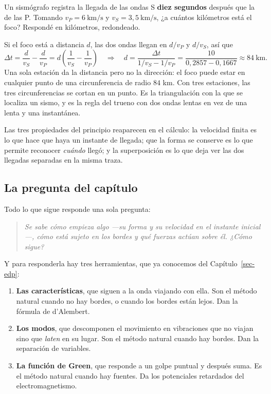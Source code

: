 \documentclass[
  spanish,
  a4paper,
]{scrbook}
\providecommand{\tightlist}{%
  \setlength{\itemsep}{0pt}\setlength{\parskip}{0pt}}
\theoremstyle{definition}
\theoremstyle{plain}
\theoremstyle{definition}
\theoremstyle{plain}
\theoremstyle{definition}
\theoremstyle{remark}
\begin{document}
Un sismógrafo registra la llegada de las ondas S \textbf{diez segundos}
después que la de las P. Tomando \(v_P = 6\ \text{km/s}\) y
\(v_S = 3{,}5\ \text{km/s}\), ¿a cuántos kilómetros está el foco?
Respondé en kilómetros, redondeado.

Si el foco está a distancia \(d\), las dos ondas llegan en \(d/v_P\) y
\(d/v_S\), así que \[
\Delta t = \frac{d}{v_S} - \frac{d}{v_P} = d\left(\frac{1}{v_S}-\frac{1}{v_P}\right)
\quad\Longrightarrow\quad
d = \frac{\Delta t}{1/v_S - 1/v_P} = \frac{10}{0{,}2857 - 0{,}1667} \approx 84\ \text{km}.
\] Una sola estación da la distancia pero no la dirección: el foco puede
estar en cualquier punto de una circunferencia de radio \(84\) km. Con
tres estaciones, las tres circunferencias se cortan en un punto. Es la
triangulación con la que se localiza un sismo, y es la regla del trueno
con dos ondas lentas en vez de una lenta y una instantánea.

Las tres propiedades del principio reaparecen en el cálculo: la
velocidad finita es lo que hace que haya un instante de llegada; que la
forma se conserve es lo que permite reconocer \emph{cuándo} llegó; y la
superposición es lo que deja ver las dos llegadas separadas en la misma
traza.

\subsection{La pregunta del capítulo}\label{sec-hip-pregunta}

Todo lo que sigue responde una sola pregunta:

\begin{quote}
\emph{Se sabe cómo empieza algo ---su forma y su velocidad en el
instante inicial---, cómo está sujeto en los bordes y qué fuerzas actúan
sobre él. ¿Cómo sigue?}
\end{quote}

Y para responderla hay tres herramientas, que ya conocemos del
Capítulo~\ref{sec-edp}:

\begin{enumerate}
\def\labelenumi{\arabic{enumi}.}
\tightlist
\item
  \textbf{Las características}, que siguen a la onda viajando con ella.
  Son el método natural cuando no hay bordes, o cuando los bordes están
  lejos. Dan la fórmula de d'Alembert.
\item
  \textbf{Los modos}, que descomponen el movimiento en vibraciones que
  no viajan sino que \emph{laten} en su lugar. Son el método natural
  cuando hay bordes. Dan la separación de variables.
\item
  \textbf{La función de Green}, que responde a un golpe puntual y
  después suma. Es el método natural cuando hay fuentes. Da los
  potenciales retardados del electromagnetismo.
\end{enumerate}
\end{document}
